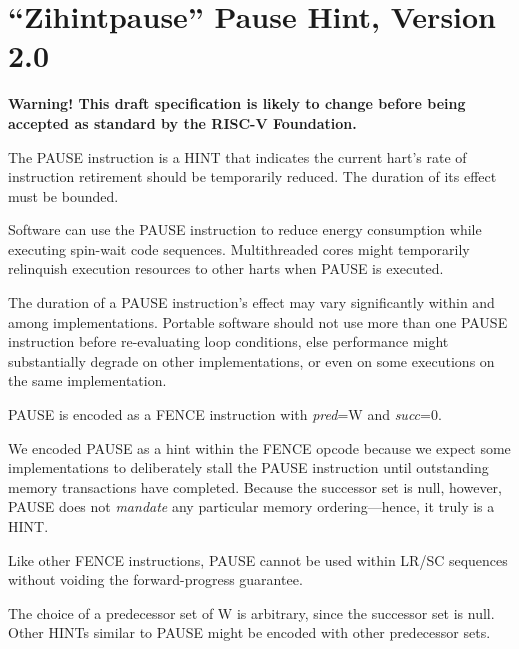 \chapter{``Zihintpause'' Pause Hint, Version 2.0}
\label{chap:zihintpause}

{\bf Warning! This draft specification is likely to change before being
accepted as standard by the RISC-V Foundation.}

The PAUSE instruction is a HINT that indicates the current hart's rate of
instruction retirement should be temporarily reduced.  The duration of its
effect must be bounded.

\begin{commentary}
Software can use the PAUSE instruction to reduce energy consumption while
executing spin-wait code sequences.  Multithreaded cores might temporarily
relinquish execution resources to other harts when PAUSE is executed.

The duration of a PAUSE instruction's effect may vary significantly within and
among implementations.
Portable software should not use more than one PAUSE instruction before
re-evaluating loop conditions, else performance might substantially degrade on
other implementations, or even on some executions on the same implementation.
\end{commentary}

PAUSE is encoded as a FENCE instruction with {\em pred}=W and {\em succ}=0.

\begin{commentary}
We encoded PAUSE as a hint within the FENCE opcode because we expect some
implementations to deliberately stall the PAUSE instruction until outstanding
memory transactions have completed.
Because the successor set is null, however, PAUSE does not {\em mandate} any
particular memory ordering---hence, it truly is a HINT.

Like other FENCE instructions, PAUSE cannot be used within LR/SC sequences
without voiding the forward-progress guarantee.

The choice of a predecessor set of W is arbitrary, since the successor set is
null.
Other HINTs similar to PAUSE might be encoded with other predecessor sets.
\end{commentary}

